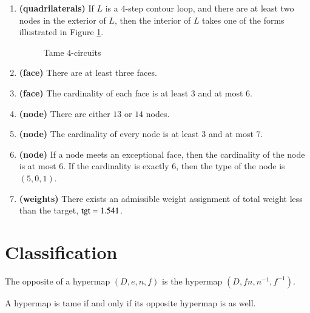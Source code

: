 \begin{enumerate}
    \item {\bf (quadrilaterals)} If $L$ is a $4$-step contour loop, and there are at least two nodes
    in the exterior of $L$, then the interior of $L$ takes one of the forms
    illustrated in Figure
    \ref{fig:fourcircuit}.
    \label{definition:tame:4-circuit}
    \begin{figure}[htb]
        \centering
        \caption{Tame $4$-circuits}
        \label{fig:fourcircuit}
    \end{figure}
  \item {\bf (face)} There are at least three faces.
    \item {\bf (face)} The cardinality of each face is at least $3$ and at most $6$.
    \label{definition:tame:length}
    \item {\bf (node)} There are either $13$ or $14$ nodes.
    \item {\bf (node)} The cardinality of every node is at least $3$ and at most
    $7$.
    \label{definition:tame:degree}
    \item {\bf (node)} If a node meets an exceptional face,
        then the cardinality of the node is at most $6$.  If the
        cardinality is exactly $6$, then the type of the node
        is $(5,0,1)$.
    \label{definition:tame:degreeE}
    \item {\bf (weights)} There exists an admissible weight assignment
        of total weight less than the target, ${\operatorname{tgt}}=1.541$.
    \label{definition:tame:squander}
\end{enumerate}
%

\section{Classification}
    \label{sec:proof-classification}

\label{sec:classification}




\begin{definition}[opposite] The opposite of a hypermap $(D,e,n,f)$ is the
hypermap $(D,f n,n^{-1},f^{-1})$.
\end{definition}

\begin{lemma}\label{140} 
A hypermap is tame if and only if its opposite hypermap is as well.
\end{lemma}

